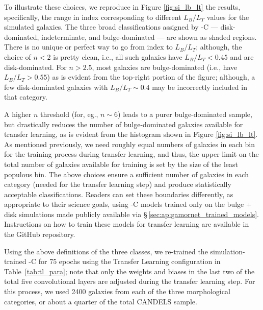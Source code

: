 To illustrate these choices, we reproduce in Figure \ref{fig:si_lb_lt} the \citet{simmons_08} results, specifically, the range in \sersic{} index corresponding to different $L_B/L_T$ values for the simulated galaxies. The three broad classifications assigned by \gamornet{}-C --- disk-dominated, indeterminate, and bulge-dominated --- are shown as shaded regions. There is no unique or perfect way to go from \sersic{} index to $L_B/L_T$; although, the choice of $n<2$ is pretty clean, i.e., all such galaxies have $L_B/L_T < 0.45$ and are disk-dominated. For $n>2.5$, most galaxies are bulge-dominated (i.e., have $L_B/L_T > 0.55$) as is evident from the top-right portion of the figure; although, a few disk-dominated galaxies with $L_B/L_T \sim 0.4$ may be incorrectly included in that category. 
    
A higher $n$ threshold (for, eg., $n\sim6$) leads to a purer bulge-dominated sample, but drastically reduces the number of bulge-dominated galaxies available for transfer learning, as is evident from the histogram shown in Figure \ref{fig:si_lb_lt}. As mentioned previously, we need roughly equal numbers of galaxies in each bin for the training process during transfer learning, and thus, the upper limit on the total number of galaxies available for training is set by the size of the least populous bin. The above choices ensure a sufficient number of galaxies in each category (needed for the transfer learning step) and produce statistically acceptable classifications. Readers can set these boundaries differently, as appropriate to their science goals, using \gamornet{}-C models trained only on the bulge + disk simulations made publicly available via \S\,\ref{sec:ap:gamornet_trained_models}. Instructions on how to train these models for transfer learning are available in the GitHub repository.
    
Using the above definitions of the three classes, we re-trained the simulation-trained \gamornet{}-C for 75 epochs using the Transfer Learning configuration in Table~\ref{tab:tl_para}; note that only the weights and biases in the last two of the total five convolutional layers are adjusted during the transfer learning step. For this process, we used 2400 galaxies from each of the three morphological categories, or about a quarter of the total CANDELS sample.

